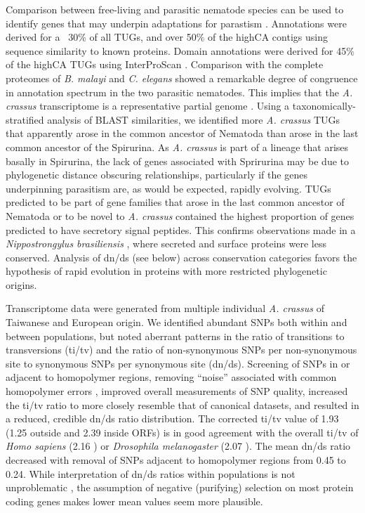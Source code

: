 \documentclass[10pt]{bmc_article}
\newenvironment{bmcformat}{\begin{raggedright}\baselineskip20pt\sloppy\setboolean{publ}{false}}{\end{raggedright}\baselineskip20pt\sloppy}
\begin{document}
\begin{bmcformat}
Comparison between free-living and parasitic nematode species can be
used to identify genes that may underpin adaptations for parastism
\cite{parkinson_transcriptomic_2004, wasmuth_extent_2008}. Annotations
were derived for a ~30\% of all TUGs, and over 50\% of the highCA
contigs using sequence similarity to known proteins. Domain
annotations were derived for 45\% of the highCA TUGs using
InterProScan \cite{pmid11590104}. Comparison with the complete
proteomes of \textit{B. malayi} and \textit{C. elegans} showed a
remarkable degree of congruence in annotation spectrum in the two
parasitic nematodes. This implies that the \textit{A. crassus}
transcriptome is a representative partial genome
\cite{parkinson_partigene--constructing_2004}. Using a
taxonomically-stratified analysis of BLAST similarities, we identified
more \textit{A. crassus} TUGs that apparently arose in the common
ancestor of Nematoda than arose in the last common ancestor of the
Spirurina. As \textit{A. crassus} is part of a lineage that arises
basally in Spirurina, the lack of genes associated with Sprirurina may
be due to phylogenetic distance obscuring relationships, particularly
if the genes underpinning parasitism are, as would be expected,
rapidly evolving. TUGs predicted to be part of gene families that
arose in the last common ancestor of Nematoda or to be novel to
\textit{A. crassus} contained the highest proportion of genes
predicted to have secretory signal peptides. This confirms
observations made in a \textit{Nippostrongylus brasiliensis}
\cite{harcus_signal_2004}, where secreted and surface proteins were
less conserved. Analysis of dn/ds (see below) across conservation
categories favors the hypothesis of rapid evolution in proteins with
more restricted phylogenetic origins.

Transcriptome data were generated from multiple individual
\textit{A. crassus} of Taiwanese and European origin. We identified
abundant SNPs both within and between populations, but noted aberrant
patterns in the ratio of transitions to transversions (ti/tv) and the
ratio of non-synonymous SNPs per non-synonymous site to synonymous
SNPs per synonymous site (dn/ds). Screening of SNPs in or adjacent to
homopolymer regions, removing “noise'' associated with common
homopolymer errors \cite{pmid21685085}, improved overall measurements
of SNP quality, increased the ti/tv ratio to more closely resemble
that of canonical datasets, and resulted in a reduced, credible dn/ds
ratio distribution. The corrected ti/tv value of 1.93 (1.25 outside
and 2.39 inside ORFs) is in good agreement with the overall ti/tv of
\textit{Homo sapiens} (2.16 \cite{pmid21169219}) or \textit{Drosophila
  melanogaster} (2.07 \cite{pmid21143862}). The mean dn/ds ratio
decreased with removal of SNPs adjacent to homopolymer regions from
0.45 to 0.24. While interpretation of dn/ds ratios within populations
is not unproblematic \cite{pmid19081788}, the assumption of negative
(purifying) selection on most protein coding genes makes lower mean
values seem more plausible.



\end{bmcformat}
\end{document}
